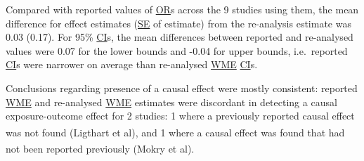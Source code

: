 \documentclass[
]{article}
\begin{document}
Compared with reported values of \hyperref[acronyms_OR]{OR}s across the 9 studies using them, the mean difference for effect estimates (\hyperref[acronyms_SE]{SE} of estimate) from the re-analysis estimate was 0.03 (0.17). For 95\% \hyperref[acronyms_CI]{CI}s, the mean differences between reported and re-analysed values were 0.07 for the lower bounds and -0.04 for upper bounds, i.e.~reported \hyperref[acronyms_CI]{CI}s were narrower on average than re-analysed \hyperref[acronyms_WME]{WME} \hyperref[acronyms_CI]{CI}s.

Conclusions regarding presence of a causal effect were mostly consistent: reported \hyperref[acronyms_WME]{WME} and re-analysed \hyperref[acronyms_WME]{WME} estimates were discordant in detecting a causal exposure-outcome effect for 2 studies: 1 where a previously reported causal effect was not found (Ligthart et al\textsuperscript{}), and 1 where a causal effect was found that had not been reported previously (Mokry et al\textsuperscript{}).
\end{document}
